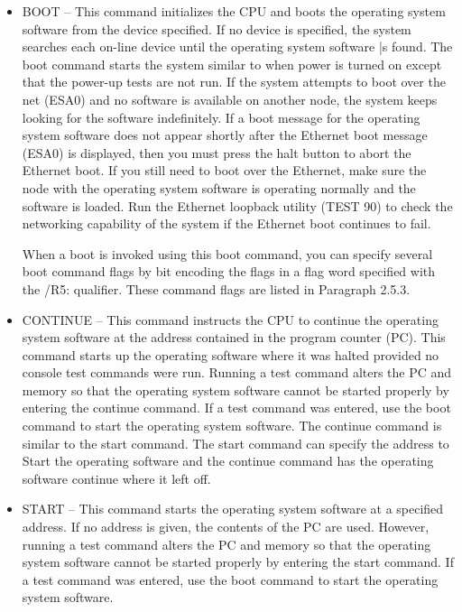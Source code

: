 \begin{itemize}
\item BOOT -- This command initializes the CPU and boots the operating 
system software from the device specified. If no device is specified, the
system searches each on-line device until the operating system software
|s found. The boot command starts the system similar to when power
is turned on except that the power-up tests are not run. If the system
attempts to boot over the net (ESA0) and no software is available on
another node, the system keeps looking for the software indefinitely.
If a boot message for the operating system software does not appear
shortly after the Ethernet boot message (ESA0) is displayed, then you
must press the halt button to abort the Ethernet boot. If you still need
to boot over the Ethernet, make sure the node with the operating system 
software is operating normally and the software is loaded. Run the
Ethernet loopback utility (TEST 90) to check the networking capability
of the system if the Ethernet boot continues to fail.

When a boot is invoked using this boot command, you can specify
several boot command flags by bit encoding the flags in a flag word
specified with the /R5: qualifier. These command flags are listed in
Paragraph 2.5.3.

\item CONTINUE -- This command instructs the CPU to continue the 
operating system software at the address contained in the program counter
(PC). This command starts up the operating software where it was halted
provided no console test commands were run. Running a test command
alters the PC and memory so that the operating system software cannot
be started properly by entering the continue command. If a test command 
was entered, use the boot command to start the operating system
software. The continue command is similar to the start command. The
start command can specify the address to Start the operating software
and the continue command has the operating software continue where
it left off.

\item START -- This command starts the operating system software at a 
specified address. If no address is given, the contents of the PC are used.
However, running a test command alters the PC and memory so that the
operating system software cannot be started properly by entering the
start command. If a test command was entered, use the boot command
to start the operating system software.

\end{itemize}

